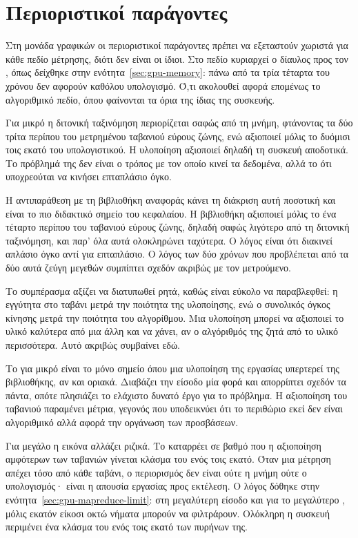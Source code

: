 \section{Περιοριστικοί παράγοντες}
\label{sec:gpu-bottlenecks}

Στη μονάδα γραφικών οι περιοριστικοί παράγοντες πρέπει να εξεταστούν χωριστά για
κάθε πεδίο μέτρησης, διότι δεν είναι οι ίδιοι. Στο πεδίο 
κυριαρχεί ο δίαυλος προς τον , όπως δείχθηκε στην
ενότητα~\ref{sec:gpu-memory}: πάνω από τα τρία τέταρτα του χρόνου δεν αφορούν
καθόλου υπολογισμό. Ό,τι ακολουθεί αφορά επομένως το αλγοριθμικό πεδίο, όπου
φαίνονται τα όρια της ίδιας της συσκευής.

Για μικρό  η διτονική ταξινόμηση περιορίζεται σαφώς από τη μνήμη,
φτάνοντας τα δύο τρίτα περίπου του μετρημένου ταβανιού εύρους ζώνης, ενώ
αξιοποιεί μόλις το δυόμισι τοις εκατό του υπολογιστικού. Η υλοποίηση αξιοποιεί
δηλαδή τη συσκευή αποδοτικά. Το πρόβλημά της δεν είναι ο τρόπος με τον οποίο
κινεί τα δεδομένα, αλλά το ότι υποχρεούται να κινήσει επταπλάσιο όγκο.

Η αντιπαράθεση με τη βιβλιοθήκη αναφοράς κάνει τη διάκριση αυτή ποσοτική και
είναι το πιο διδακτικό σημείο του κεφαλαίου. Η βιβλιοθήκη αξιοποιεί μόλις το ένα
τέταρτο περίπου του ταβανιού εύρους ζώνης, δηλαδή σαφώς λιγότερο από τη διτονική
ταξινόμηση, και παρ' όλα αυτά ολοκληρώνει ταχύτερα. Ο λόγος είναι ότι διακινεί
απλάσιο όγκο αντί για επταπλάσιο. Ο λόγος των δύο χρόνων που προβλέπεται από τα
δύο αυτά ζεύγη μεγεθών συμπίπτει σχεδόν ακριβώς με τον μετρούμενο.

Το συμπέρασμα αξίζει να διατυπωθεί ρητά, καθώς είναι εύκολο να παραβλεφθεί: η
εγγύτητα στο ταβάνι μετρά την ποιότητα της υλοποίησης, ενώ ο συνολικός όγκος
κίνησης μετρά την ποιότητα του αλγορίθμου. Μια υλοποίηση μπορεί να αξιοποιεί το
υλικό καλύτερα από μια άλλη και να χάνει, αν ο αλγόριθμός της ζητά από το υλικό
περισσότερα. Αυτό ακριβώς συμβαίνει εδώ.

Το  για μικρό  είναι το μόνο σημείο όπου μια υλοποίηση της
εργασίας υπερτερεί της βιβλιοθήκης, αν και οριακά. Διαβάζει την είσοδο μία φορά
και απορρίπτει σχεδόν τα πάντα, οπότε πλησιάζει το ελάχιστο δυνατό έργο για το
πρόβλημα. Η αξιοποίηση του ταβανιού παραμένει μέτρια, γεγονός που υποδεικνύει
ότι το περιθώριο εκεί δεν είναι αλγοριθμικό αλλά αφορά την οργάνωση των
προσβάσεων.

Για μεγάλο  η εικόνα αλλάζει ριζικά. Το  καταρρέει σε
βαθμό που η αξιοποίηση αμφότερων των ταβανιών γίνεται κλάσμα του ενός τοις
εκατό. Όταν μια μέτρηση απέχει τόσο από κάθε ταβάνι, ο περιορισμός δεν είναι
ούτε η μνήμη ούτε ο υπολογισμός· είναι η απουσία εργασίας προς εκτέλεση. Ο λόγος
δόθηκε στην ενότητα~\ref{sec:gpu-mapreduce-limit}: στη μεγαλύτερη είσοδο και για
το μεγαλύτερο , μόλις εκατόν είκοσι οκτώ νήματα μπορούν να φιλτράρουν.
Ολόκληρη η συσκευή περιμένει ένα κλάσμα του ενός τοις εκατό των πυρήνων της.

